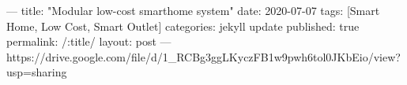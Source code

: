 ---
title: "Modular low-cost smarthome system"
date: 2020-07-07
tags: [Smart Home, Low Cost, Smart Outlet]
categories: jekyll update
published: true
permalink: /:title/
layout: post
---
https://drive.google.com/file/d/1_RCBg3ggLKyczFB1w9pwh6tol0JKbEio/view?usp=sharing
